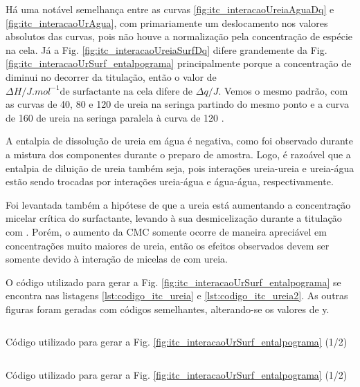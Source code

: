 	Há uma notável semelhança entre as curvas \ref{fig:itc_interacaoUreiaAguaDq} e \ref{fig:itc_interacaoUrAgua}, com primariamente um deslocamento nos valores absolutos das curvas, pois não houve a normalização pela concentração de espécie na cela. Já a Fig. \ref{fig:itc_interacaoUreiaSurfDq} difere grandemente da Fig. \ref{fig:itc_interacaoUrSurf_entalpograma} principalmente porque a concentração de \TTAB{} diminui no decorrer da titulação, então o valor de \(\Delta H/J.mol^{-1} \text{de surfactante na cela}\) difere de \(\Delta q/J\). Vemos o mesmo padrão, com as curvas de 40, 80 e 120 \mM{} de ureia na seringa partindo do mesmo ponto e a curva de 160 \mM{} de ureia na seringa paralela à curva de 120 \mM.
	
	
	A entalpia de dissolução de ureia em água é negativa, como foi observado durante a mistura dos componentes durante o preparo de amostra. Logo, é razoável que a entalpia de diluição de ureia também seja, pois interações ureia-ureia e ureia-água estão sendo trocadas por interações ureia-água e água-água, respectivamente.
	
	
	Foi levantada também a hipótese de que a ureia está aumentando a concentração micelar crítica do surfactante, levando à sua desmicelização durante a titulação com \TTAB{}. Porém, o aumento da CMC somente ocorre de maneira apreciável em concentrações muito maiores de ureia, então os efeitos observados devem ser somente devido à interação de micelas de \TTAB{} com ureia.
	
	O código utilizado para gerar a Fig. \ref{fig:itc_interacaoUrSurf_entalpograma} se encontra nas listagens \ref{lst:codigo_itc_ureia} e \ref{lst:codigo_itc_ureia2}. As outras figuras foram geradas com códigos semelhantes, alterando-se os valores de y.
	
	\begin{listing}[h]
		\inputminted{python}{./python/ITC_tratamento_ureia_ttab.py}
		\caption{Código utilizado para gerar a Fig. \ref{fig:itc_interacaoUrSurf_entalpograma} (1/2)}
		\label{lst:codigo_itc_ureia}
	\end{listing}

	\begin{listing}[h]
		\inputminted{python}{./python/ITC_tratamento_ureia_ttab2.py}
		\caption{Código utilizado para gerar a Fig. \ref{fig:itc_interacaoUrSurf_entalpograma} (1/2)}
		\label{lst:codigo_itc_ureia2}
	\end{listing}